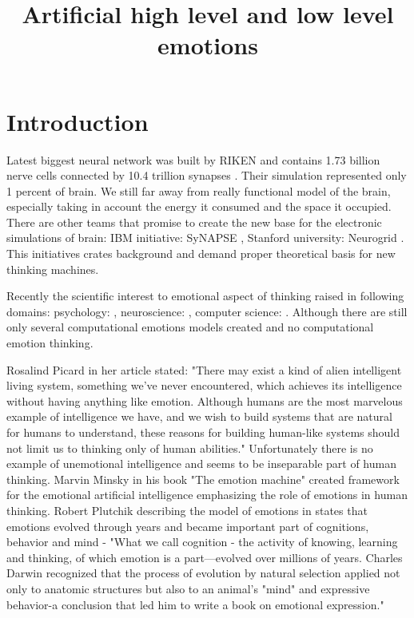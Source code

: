 \title{Artificial high level and low level emotions}

\section{Introduction}

Latest biggest neural network was built by RIKEN and contains 1.73 billion nerve cells connected by 10.4 trillion synapses \cite{RIKEN}. Their simulation represented only 1 percent of brain. We still far away from really functional model of the brain, especially taking in account the energy it consumed and the space it occupied. There are other teams that promise to create the new base for the electronic simulations of brain: IBM initiative: SyNAPSE \cite{SyNAPSE}, Stanford university: Neurogrid \cite{Neurogrid}. This initiatives crates background and demand proper theoretical basis for new thinking machines.

Recently the scientific interest to emotional aspect of thinking raised in following domains: psychology: \cite{natureofemotions, appraisal_determinants_of_emotions, appraisal_considered_as_a_process, putting_appraisal_in_context, sex_differencies}, neuroscience: \cite{emotionsbraintorobot, parsingreward, neuromodulatory, cubeofemotions, natureofemotions, putting_appraisal_in_context, anatomic}, computer science: \cite{intelligent_machinery, emotionandsociable, senticcomputing, hourglass, affectivemodelofinterplay, affectivecomputing, dont_worry_be_happy, hourglass, senticcomputing, parsingreward, emotionsbraintorobot, motivationalrewardframework, roleofemotions, computationalmodelsemotionscognition}. Although there are still only several computational emotions models created \cite{computationalmodelsemotion, computationalmodelsemotionscognition, evaluatingcomutationalmodel, threelevel} and no computational emotion thinking.

Rosalind Picard in her article \cite{affectivecomputingchallanges} stated: "There may exist a kind of alien intelligent living system, something we’ve never encountered, which achieves its intelligence without having anything like emotion. Although humans are the most marvelous example of intelligence we have, and we wish to build systems that are natural for humans to understand, these reasons for building human-like systems should not limit us to thinking only of human abilities." Unfortunately there is no example of unemotional intelligence and seems to be inseparable part of human thinking. Marvin Minsky in his book "The emotion machine" \cite{emotionmachine} created framework for the emotional artificial intelligence emphasizing the role of emotions in human thinking. Robert Plutchik describing the model of emotions in \cite{natureofemotions} states that emotions evolved through years and became important part of cognitions, behavior and mind - "What we call cognition - the activity of knowing, learning and thinking, of which emotion is a part—evolved over millions of years. Charles Darwin recognized that the process of evolution by natural selection applied not only to anatomic structures but also to an animal’s "mind" and expressive behavior-a conclusion that led him to write a book on emotional expression."

